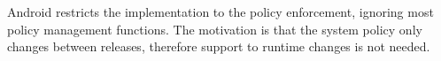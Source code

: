 Android restricts the \sel implementation to the policy enforcement,
ignoring most policy management functions.  The motivation is that the
system policy only changes between releases, therefore support to
runtime changes is not needed.


